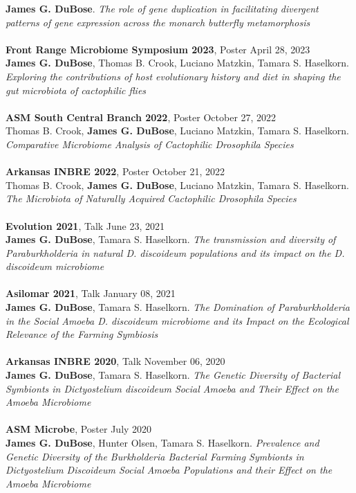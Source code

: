 \documentclass{article}
\begin{document}
\textbf{James G. DuBose}. \emph{The role of gene duplication in facilitating divergent patterns of gene expression across the monarch butterfly metamorphosis}\\
\\
\textbf{Front Range Microbiome Symposium 2023}, Poster \hfill April 28, 2023\\
\textbf{James G. DuBose}, Thomas B. Crook, Luciano Matzkin, Tamara S. Haselkorn. \emph{Exploring the contributions of host evolutionary history and diet in shaping the gut microbiota of cactophilic flies}\\
\\
\textbf{ASM South Central Branch 2022}, Poster \hfill October 27, 2022\\
Thomas B. Crook, \textbf{James G. DuBose}, Luciano Matzkin, Tamara S. Haselkorn. \emph{Comparative Microbiome Analysis of Cactophilic Drosophila Species}\\
\\
\textbf{Arkansas INBRE 2022}, Poster \hfill October 21, 2022\\
Thomas B. Crook, \textbf{James G. DuBose}, Luciano Matzkin, Tamara S. Haselkorn. \emph{The Microbiota of Naturally Acquired Cactophilic Drosophila Species}\\
\\
\textbf{Evolution 2021}, Talk \hfill June 23, 2021\\
\textbf{James G. DuBose}, Tamara S. Haselkorn. \emph{The transmission and diversity of Paraburkholderia in natural D. discoideum populations and its impact on the D. discoideum microbiome}\\
\\
\textbf{Asilomar 2021}, Talk \hfill January 08, 2021\\
\textbf{James G. DuBose}, Tamara S. Haselkorn. \emph{The Domination of Paraburkholderia in the Social Amoeba D. discoideum microbiome and its Impact on the Ecological Relevance of the Farming Symbiosis}\\
\\
\textbf{Arkansas INBRE 2020}, Talk \hfill November 06, 2020\\
\textbf{James G. DuBose}, Tamara S. Haselkorn. \emph{The Genetic Diversity of Bacterial Symbionts in Dictyostelium discoideum Social Amoeba and Their Effect on the Amoeba Microbiome}\\
\\
\textbf{ASM Microbe}, Poster \hfill July 2020\\
\textbf{James G. DuBose}, Hunter Olsen, Tamara S. Haselkorn. \emph{Prevalence and Genetic Diversity
of the Burkholderia Bacterial Farming Symbionts in Dictyostelium Discoideum Social Amoeba Populations and their Effect on the Amoeba Microbiome}\\
\end{document}
